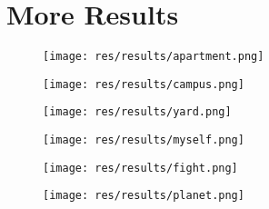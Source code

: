 
\section{More Results}
\begin{figure}[H]
  \centering
  \texttt{[image: res/results/apartment.png]}
\end{figure}
\begin{figure}[H]
  \centering
  \texttt{[image: res/results/campus.png]}
\end{figure}

\begin{figure}[H]
  \centering
  \texttt{[image: res/results/yard.png]}
\end{figure}

\begin{figure}[H]
  \centering
  \texttt{[image: res/results/myself.png]}
\end{figure}

\begin{figure}[H]
  \centering
  \texttt{[image: res/results/fight.png]}
\end{figure}

\begin{figure}[H]
  \centering
  \texttt{[image: res/results/planet.png]}
\end{figure}
